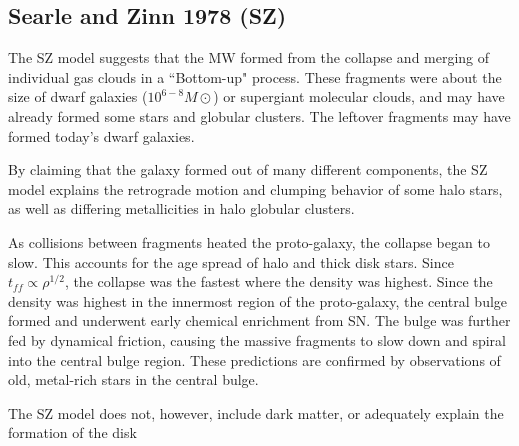 \subsection{Searle and Zinn 1978 (SZ)}

The SZ model suggests that the MW formed from the collapse and merging of individual gas clouds in a ``Bottom-up" process. These fragments were about the size of dwarf galaxies ($10^{6-8} M\odot$) or supergiant molecular clouds, and may have already formed some stars and globular clusters. The leftover fragments may have formed today's dwarf galaxies. 

By claiming that the galaxy formed out of many different components, the SZ model explains the retrograde motion and clumping behavior of some halo stars, as well as differing metallicities in halo globular clusters. 

As collisions between fragments heated the proto-galaxy, the collapse began to slow. This accounts for the age spread of halo and thick disk stars. Since $t_{ff} \propto \rho^{1/2}$, the collapse was the fastest where the density was highest. Since the density was highest in the innermost region of the proto-galaxy, the central bulge formed and underwent early chemical enrichment from SN. The bulge was further fed by dynamical friction, causing the massive fragments to slow down and spiral into the central bulge region. These predictions are confirmed by observations of old, metal-rich stars in the central bulge. 

The SZ model does not, however, include dark matter, or adequately explain the formation of the disk 




